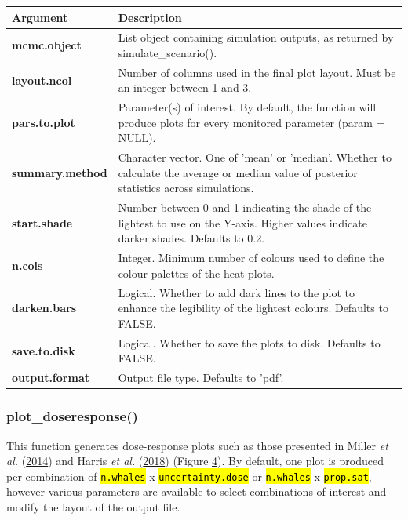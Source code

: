 \documentclass[
]{article}
\begin{document}
\renewcommand{\arraystretch}{1.4}

\begin{longtable}{>{\bfseries}l|>{\raggedright\arraybackslash}p{30em}}
\toprule
\textbf{Argument} & \textbf{Description}\\
\midrule
mcmc.object & List object containing simulation outputs, as returned by simulate\_scenario().\\
layout.ncol & Number of columns used in the final plot layout. Must be an integer between 1 and 3.\\
pars.to.plot & Parameter(s) of interest. By default, the function will produce plots for every monitored parameter (param = NULL).\\
summary.method & Character vector. One of 'mean' or 'median'. Whether to calculate the average or median value of posterior statistics across simulations.\\
start.shade & Number between 0 and 1 indicating the shade of the lightest to use on the Y-axis. Higher values indicate darker shades. Defaults to 0.2.\\
\addlinespace
n.cols & Integer. Minimum number of colours used to define the colour palettes of the heat plots.\\
darken.bars & Logical. Whether to add dark lines to the plot to enhance the legibility of the lightest colours. Defaults to FALSE.\\
save.to.disk & Logical. Whether to save the plots to disk. Defaults to FALSE.\\
output.format & Output file type. Defaults to 'pdf'.\\
\bottomrule
\end{longtable}

\subsubsection{plot\_doseresponse()}

This function generates dose-response plots such as those presented in Miller \emph{et al.} (\protect\hyperlink{ref-Miller2014}{2014}) and Harris \emph{et al.} (\protect\hyperlink{ref-Harris2018}{2018}) (Figure \hyperlink{fig4}{4}). By default, one plot is produced per combination of \textcolor{codecolor}{\texttt{\hl{n.whales}}} x \textcolor{codecolor}{\texttt{\hl{uncertainty.dose}}} or \textcolor{codecolor}{\texttt{\hl{n.whales}}} x \textcolor{codecolor}{\texttt{\hl{prop.sat}}}, however various parameters are available to select combinations of interest and modify the layout of the output file.
\end{document}
